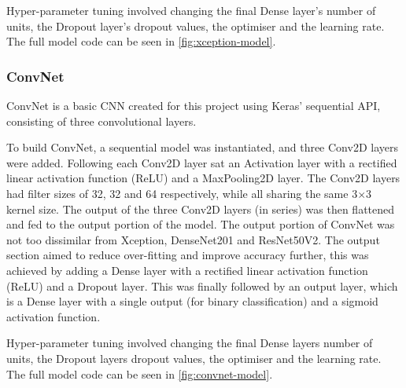 Hyper-parameter tuning involved changing the final Dense layer's number of units, the Dropout layer's dropout values, the optimiser and the learning rate. The full model code can be seen in \autoref{fig:xception-model}.

\subsubsection{ConvNet}
ConvNet is a basic CNN created for this project using Keras' sequential API, consisting of three convolutional layers.

To build ConvNet, a sequential model was instantiated, and three Conv2D layers were added. Following each Conv2D layer sat an Activation layer with a rectified linear activation function (ReLU) and a MaxPooling2D layer. The Conv2D layers had filter sizes of 32, 32 and 64 respectively, while all sharing the same 3$\times$3 kernel size. The output of the three Conv2D layers (in series) was then flattened and fed to the output portion of the model. The output portion of ConvNet was not too dissimilar from Xception, DenseNet201 and ResNet50V2. The output section aimed to reduce over-fitting and improve accuracy further, this was achieved by adding a Dense layer with a rectified linear activation function (ReLU) and a Dropout layer. This was finally followed by an output layer, which is a Dense layer with a single output (for binary classification) and a sigmoid activation function.

Hyper-parameter tuning involved changing the final Dense layers number of units, the Dropout layers dropout values, the optimiser and the learning rate. The full model code can be seen in \autoref{fig:convnet-model}.

